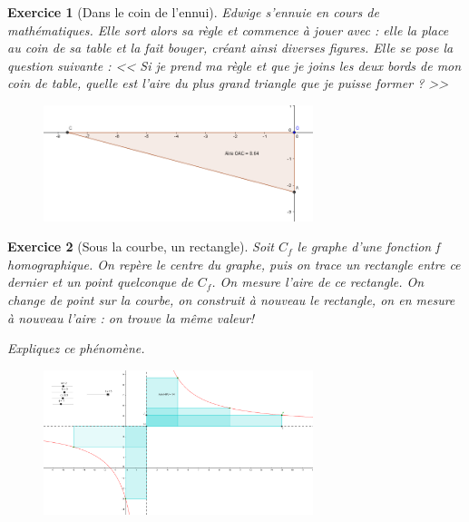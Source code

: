 \documentclass[12pt]{article}
\theoremstyle{break}
\newtheorem{exo}{Exercice}
\begin{document}
\begin{exo}[Dans le coin de l'ennui]
Edwige s'ennuie en cours de mathématiques. Elle sort alors sa règle et commence à jouer avec : elle la place au coin de sa table et la fait bouger, créant ainsi diverses figures. Elle se pose la question suivante : << Si je prend ma règle et que je joins les deux bords de mon coin de table, quelle est l'aire du plus grand triangle que je puisse former ? >>

\begin{figure}[h!]
	\centering
    \includegraphics[width=0.7\textwidth]{images/TriangleCoinDeTable.png}
    
\end{figure}
\end{exo}


\begin{exo}[Sous la courbe, un rectangle]
Soit $C_f$ le graphe d'une fonction f homographique. On repère le centre du graphe, puis on trace un rectangle entre ce dernier et un point quelconque de $C_f$. On mesure l'aire de ce rectangle. On change de point sur la courbe, on construit à nouveau le rectangle, on en mesure à nouveau l'aire : on trouve la même valeur!

Expliquez ce phénomène.

\begin{figure}[h!]
	\centering
    \includegraphics[width=0.7\textwidth]{images/RectangleHomographique.png}
    
\end{figure}
\end{exo}
\end{document}
